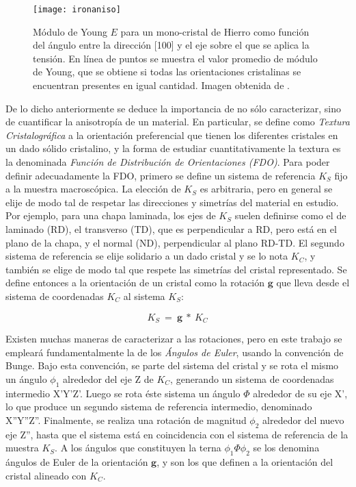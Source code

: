 \begin{figure}[!htb]
  \centering
  \texttt{[image: ironaniso]}
  \caption{Módulo de Young $E$ para un mono-cristal de Hierro como función del ángulo entre la dirección [100] y el eje sobre el que se aplica la tensión. En línea de puntos se muestra el valor promedio de módulo de Young, que se obtiene si todas las orientaciones cristalinas se encuentran presentes en igual cantidad. Imagen obtenida de \cite{randle2000introduction}.}
  \label{fig:ironaniso}
\end{figure}

De lo dicho anteriormente se deduce la importancia de no sólo caracterizar, sino de cuantificar la anisotropía de un material. 
En particular, se define como \textit{Textura Cristalográfica} a la orientación preferencial que tienen los diferentes cristales en un dado sólido cristalino, y la forma de estudiar cuantitativamente la textura es la denominada \textit{Función de Distribución de Orientaciones (FDO)}.
Para poder definir adecuadamente la FDO, primero se define un sistema de referencia $K_S$ fijo a la muestra macroscópica.
La elección de $K_S$ es arbitraria, pero en general se elije de modo tal de respetar las direcciones y simetrías del material en estudio. 
Por ejemplo, para una chapa laminada, los ejes de $K_S$ suelen definirse como el de laminado (RD), el transverso (TD), que es perpendicular a RD, pero está en el plano de la chapa, y el normal (ND), perpendicular al plano RD-TD.
El segundo sistema de referencia se elije solidario a un dado cristal y se lo nota $K_C$, y también se elige de modo tal que respete las simetrías del cristal representado.
Se define entonces a la orientación de un cristal como la rotación $\mathbf{g}$ que lleva desde el sistema de coordenadas $K_C$ al sistema $K_S$:

\begin{equation}
  K_S \ = \ \mathbf{g} \ * \ K_C
  \label{eq:orientation}
\end{equation}
\noindent

Existen muchas maneras de caracterizar a las rotaciones, pero en este trabajo se empleará fundamentalmente la de los \textit{Ángulos de Euler}, usando la convención de Bunge\cite{bunge2013texture}.
Bajo esta convención, se parte del sistema del cristal y se rota el mismo un ángulo $\phi_1$ alrededor del eje Z de $K_C$, generando un sistema de coordenadas intermedio X'Y'Z'.
Luego se rota éste sistema un ángulo $\Phi$ alrededor de su eje X', lo que produce un segundo sistema de referencia intermedio, denominado X''Y''Z''. Finalmente, se realiza una rotación de magnitud $\phi_2$ alrededor del nuevo eje Z'', hasta que el sistema está en coincidencia con el sistema de referencia de la muestra $K_S$.
A los ángulos que constituyen la terna $\phi_1 \Phi \phi_2$ se los denomina ángulos de Euler de la orientación $\mathbf{g}$, y son los que definen a la orientación del cristal alineado con $K_C$.

